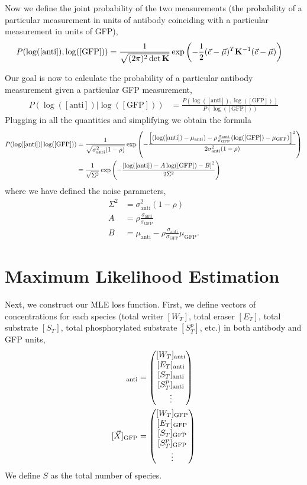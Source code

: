 \documentclass[aps,onecolumn,superscriptaddress,notitlepage]{revtex4-1}
\newcommand{\sigmaGFP}{\sigma_{\mathrm{GFP}}}
\newcommand{\sigmaanti}{\sigma_{\mathrm{anti}}}
\newcommand{\muGFP}{\mu_{\mathrm{GFP}}}
\newcommand{\muanti}{\mu_{\mathrm{anti}}}
\newcommand{\lGFP}{\log([\mathrm{GFP}])}
\newcommand{\lanti}{\log([\mathrm{anti}])}
\begin{document}
Now we define the joint probability of the two measurements (the probability of a particular measurement in units of antibody coinciding with a particular measurement in units of GFP),
\begin{align}
P(\lanti, \lGFP) &= \frac{1}{\sqrt{(2\pi)^2 \det \mathbf{K}}}\exp\qty(-\frac{1}{2}(\vec{c}-\vec{\mu})^T \mathbf{K}^{-1}(\vec{c}-\vec{\mu}))
\end{align}

Our goal is now to calculate the probability of a particular antibody measurement given a particular GFP measurement,
\begin{align}
P(\lanti | \lGFP) &= \frac{P(\lanti, \lGFP)}{P(\lGFP)}
\end{align}
Plugging in all the quantities and simplifying we obtain the formula
\begin{align}
P(\lanti | \lGFP) &= \frac{1}{\sqrt{\sigmaanti^2(1-\rho)}}\exp\qty(-\frac{\qty[(\lanti-\muanti) - \rho \frac{\sigmaanti}{\sigmaGFP}(\lGFP-\muGFP)]^2}{2 \sigmaanti^2(1-\rho)})\\
&= \frac{1}{\sqrt{\Sigma^2}}\exp\qty(-\frac{\qty[\lanti -A\lGFP - B]^2}{2 \Sigma^2})
\end{align}
where we have defined the noise parameters,
\begin{align}
\Sigma^2 &= \sigmaanti^2(1-\rho)\\
A &=  \rho \frac{\sigmaanti}{\sigmaGFP}\\
B &= \muanti - \rho \frac{\sigmaanti}{\sigmaGFP}\muGFP.
\end{align}


\section{Maximum Likelihood Estimation}
Next, we construct our MLE loss function.
First, we define vectors of concentrations for each species (total writer $[W_T]$, total eraser $[E_T]$, total substrate $[S_T]$, total phosphorylated substrate $[S_T^p]$, etc.) in both antibody and GFP units,
\begin{align}
[\vec{X}]_{\mathrm{anti}} &= \mqty([W_T]_{\mathrm{anti}}\\
[E_T]_{\mathrm{anti}}\\
[S_T]_{\mathrm{anti}}\\
[S^p_T]_{\mathrm{anti}}\\
\vdots)\\
[\vec{X}]_{\mathrm{GFP}} &= \mqty([W_T]_{\mathrm{GFP}}\\
[E_T]_{\mathrm{GFP}}\\
[S_T]_{\mathrm{GFP}}\\
[S^p_T]_{\mathrm{GFP}}\\
\vdots)
\end{align}
We define $S$ as the total number of species.
\end{document}

